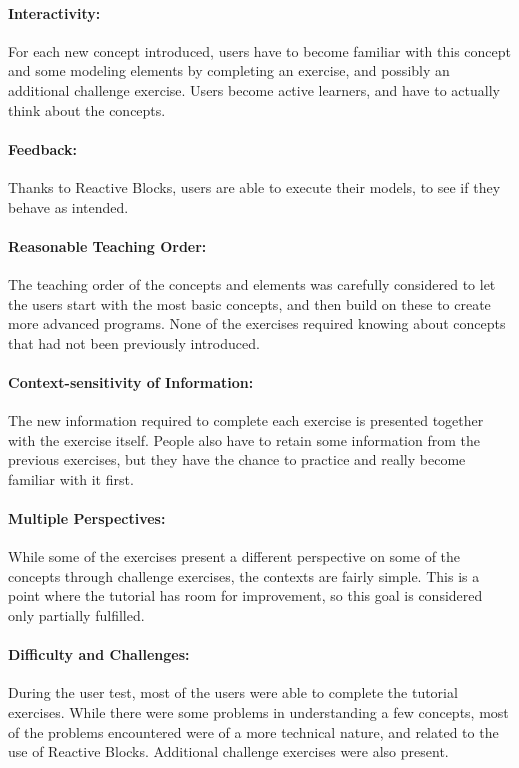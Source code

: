 \paragraph{Interactivity:} For each new concept introduced, users have to become familiar with this concept and some modeling elements by completing an exercise, and possibly an additional challenge exercise. Users become active learners, and have to actually think about the concepts.

\paragraph{Feedback:} Thanks to Reactive Blocks, users are able to execute their models, to see if they behave as intended.

\paragraph{Reasonable Teaching Order:} The teaching order of the concepts and elements was carefully considered to let the users start with the most basic concepts, and then build on these to create more advanced programs. None of the exercises required knowing about concepts that had not been previously introduced.

\paragraph{Context-sensitivity of Information:} The new information required to complete each exercise is presented together with the exercise itself. People also have to retain some information from the previous exercises, but they have the chance to practice and really become familiar with it first.

\paragraph{Multiple Perspectives:} While some of the exercises present a different perspective on some of the concepts through challenge exercises, the contexts are fairly simple. This is a point where the tutorial has room for improvement, so this goal is considered only partially fulfilled.

\paragraph{Difficulty and Challenges:} During the user test, most of the users were able to complete the tutorial exercises. While there were some problems in understanding a few concepts, most of the problems encountered were of a more technical nature, and related to the use of Reactive Blocks. Additional challenge exercises were also present.

